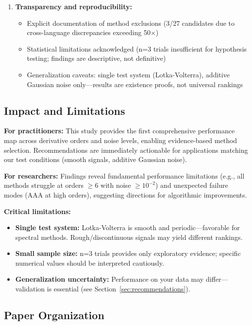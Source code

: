 \begin{enumerate}
    \item \textbf{Transparency and reproducibility:}
    \begin{itemize}
        \item Explicit documentation of method exclusions (3/27 candidates due to cross-language discrepancies exceeding 50$\times$)
        \item Statistical limitations acknowledged (n=3 trials insufficient for hypothesis testing; findings are descriptive, not definitive)
        \item Generalization caveats: single test system (Lotka-Volterra), additive Gaussian noise only—results are existence proofs, not universal rankings
    \end{itemize}
\end{enumerate}

\subsection{Impact and Limitations}
\label{sec:impact}

\textbf{For practitioners:} This study provides the first comprehensive performance map across derivative orders and noise levels, enabling evidence-based method selection. Recommendations are immediately actionable for applications matching our test conditions (smooth signals, additive Gaussian noise).

\textbf{For researchers:} Findings reveal fundamental performance limitations (e.g., all methods struggle at orders $\geq 6$ with noise $\geq 10^{-2}$) and unexpected failure modes (AAA at high orders), suggesting directions for algorithmic improvements.

\textbf{Critical limitations:}
\begin{itemize}
    \item \textbf{Single test system:} Lotka-Volterra is smooth and periodic—favorable for spectral methods. Rough/discontinuous signals may yield different rankings.
    \item \textbf{Small sample size:} n=3 trials provides only exploratory evidence; specific numerical values should be interpreted cautiously.
    \item \textbf{Generalization uncertainty:} Performance on your data may differ—validation is essential (see Section~\ref{sec:recommendations}).
\end{itemize}

\subsection{Paper Organization}
\label{sec:organization}

